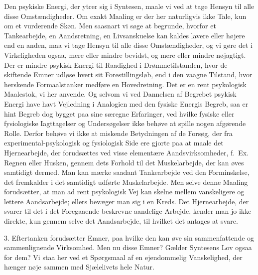 \documentclass[12pt,a4paper]{book}
\newcommand{\apage}[1]{\marginnote{\footnotesize\textit{[#1]}}}
\begin{document}
Den psykiske Energi, der ytrer sig i Syntesen, maale vi ved at tage
Hensyn til alle disse Omstændigheder. Om exakt Maaling er der her
naturligvis ikke Tale, kun om et vurderende Skøn. Men saasnart vi søge
at begrunde, hvorfor et Tankearbejde, en Aandsretning, en Livsanskuelse
kan kaldes lavere eller højere end en anden, maa vi tage Hensyn til
alle disse Omstændigheder, og vi gøre det i Virkeligheden ogsaa, mere
eller mindre bevidst, og mere eller mindre nøjagtigt. Der er mindre
psykisk Energi til Raadighed i Drømmetilstanden, hvor de skiftende
Emner udløse hvert sit Forestillingsløb, end i den vaagne Tilstand,
hvor herskende Formaalstanker medføre en Hovedretning. Det er en rent
psykologisk Maalestok, vi her anvende. Og selvom vi ved Dannelsen af
Begrebet psykisk Energi have havt Vejledning i Analogien med den
fysiske Energis Begreb, saa er hint Begreb dog bygget paa sine
særegne Erfaringer, ved hvilke fysiske eller fysiologiske Iagttagelser
og Undersøgelser ikke behøve at spille nogen afgørende Rolle. Derfor
behøve vi ikke at miskende Betydningen af de Forsøg, der fra
experimental-psykologisk og fysiologisk Side ere gjorte paa at maale
det Hjernearbejde, der forudsættes ved visse elementære
Aandsvirksomheder, f.\ Ex. Regnen eller Husken, gennem dets Forhold
til det Muskelarbejde, der kan øves samtidigt dermed. Man kan mærke
saadant Tankearbejde ved den Forminskelse, det fremkalder i det
samtidigt udførte Muskelarbejde. Men selve denne Maaling forudsætter,
at man ad rent psykologisk Vej kan skelne mellem vanskeligere og
lettere Aandsarbejde; ellers bevæger man sig i en Kreds. Det
Hjernearbejde, der svarer til det i det Foregaaende beskrevne
aandelige Arbejde, kender man jo ikke direkte, \apage{7} kun gennem selve det
Aandsarbejde, til hvilket det antages at svare.

3. Eftertanken forudsætter Emner, paa hvilke den kan øve sin
sammenfattende og sammenlignende Virksomhed. Men nu disse Emner?
Gælder Syntesens Lov ogsaa for dem? Vi staa her ved et Spørgsmaal af
en ejendommelig Vanskelighed, der hænger nøje sammen med Sjælelivets
hele Natur.
\end{document}
